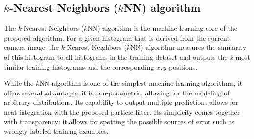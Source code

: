 \subsection{$k$-Nearest Neighbors ($k$NN) algorithm}


The $k$-Nearest Neighbors ($k$NN) algorithm is the machine learning-core of the proposed algorithm. For a given histogram that is derived from the current camera image, the $k$-Nearest Neighbors ($k$NN) algorithm measures the similarity of this histogram to all histograms in the training dataset and outputs the $k$ most similar training histograms and the corresponding $x,y$-positions.

While the $k$NN algorithm is one of the simplest machine learning algorithms, it
offers several advantages: it is non-parametric, allowing for the
modeling of arbitrary distributions. Its capability to output multiple
predictions allows for neat integration with the proposed particle filter. Its simplicity comes together with transparency: it allows for spotting the possible sources of error such as wrongly labeled training examples.